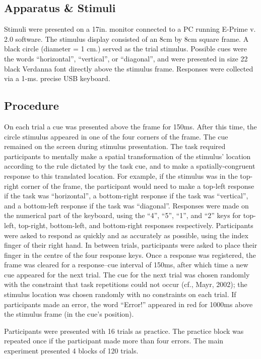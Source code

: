 \documentclass[a4paper, doc, natbib]{apa6}
\begin{document}
\subsection{Apparatus \& Stimuli}
Stimuli were presented on a 17in. monitor connected to a PC running E-Prime v. 2.0 software. The stimulus display consisted of an 8cm by 8cm square frame. A black circle (diameter = 1 cm.) served as the trial stimulus. Possible cues were the words ``horizontal'', ``vertical'', or ``diagonal'', and were presented in size 22 black Verdanna font directly above the stimulus frame. Responses were collected via a 1-ms. precise USB keyboard.

\subsection{Procedure}
On each trial a cue was presented above the frame for 150ms. After this time, the circle stimulus appeared in one of the four corners of the frame. The cue remained on the screen during stimulus presentation. The task required participants to mentally make a spatial transformation of the stimulus' location according to the rule dictated by the task cue, and to make a spatially-congruent response to this translated location. For example, if the stimulus was in the top-right corner of the frame, the participant would need to make a top-left response if the task was ``horizontal'', a bottom-right response if the task was ``vertical'', and a bottom-left response if the task was ``diagonal''. Responses were made on the numerical part of the keyboard, using the ``4'', ``5'', ``1'', and ``2'' keys for top-left, top-right, bottom-left, and bottom-right responses respectively. Participants were asked to respond as quickly and as accurately as possible, using the index finger of their right hand. In between trials, participants were asked to place their finger in the centre of the four response keys. Once a response was registered, the frame was cleared for a response--cue interval of 150ms, after which time a new cue appeared for the next trial. The cue for the next trial was chosen randomly with the constraint that task repetitions could not occur (cf., Mayr, 2002); the stimulus location was chosen randomly with no constraints on each trial. If participants made an error, the word ``Error!'' appeared in red for 1000ms above the stimulus frame (in the cue's position).

Participants were presented with 16 trials as practice. The practice block was repeated once if the participant made more than four errors. The main experiment presented 4 blocks of 120 trials. 
\end{document}

